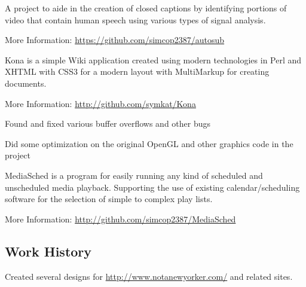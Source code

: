 \documentclass[table,tmargin=1in,bmargin=1in,letterpaper]{resume}
\begin{document}

\begin{compactitem}
\item A project to aide in the creation of closed captions by identifying portions of 
video that contain human speech using various types of signal analysis.
\item More Information: \url{https://github.com/simcop2387/autosub}
\end{compactitem}


\begin{compactitem}
\item Kona is a simple Wiki application created using modern technologies in Perl and XHTML 
with CSS3 for a modern layout with MultiMarkup for creating documents.
\item More Information: \url{http://github.com/symkat/Kona}
\end{compactitem}


\begin{compactitem}
\item Found and fixed various buffer overflows and other bugs
\item Did some optimization on the original OpenGL and other graphics code in the project
\end{compactitem}


\begin{compactitem}
\item MediaSched is a program for easily running any kind of scheduled and unscheduled media playback.  Supporting the use of existing calendar/scheduling software for the selection of simple to complex play lists.
\item More Information: \url{http://github.com/simcop2387/MediaSched}
\end{compactitem}

\subsection{Work History}

\begin{compactitem}
\item Created several designs for \url{http://www.notanewyorker.com/} and related sites.
\end{compactitem}
\end{document}
